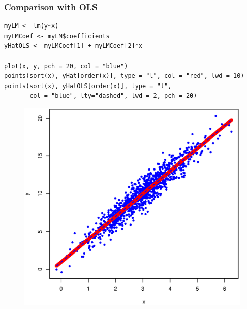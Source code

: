 \documentclass[10pt]{beamer}
\begin{document}
\begin{frame}[fragile]
\frametitle{Comparison with OLS}

\begin{verbatim}
myLM <- lm(y~x)
myLMCoef <- myLM$coefficients
yHatOLS <- myLMCoef[1] + myLMCoef[2]*x

plot(x, y, pch = 20, col = "blue")
points(sort(x), yHat[order(x)], type = "l", col = "red", lwd = 10)
points(sort(x), yHatOLS[order(x)], type = "l",
       col = "blue", lty="dashed", lwd = 2, pch = 20)
\end{verbatim}
\end{frame}


\begin{frame}[plain]
  \begin{figure}
    \centering
    \includegraphics[height=\textheight]{OLSvsML}
  \end{figure}
\end{frame}
\end{document}
